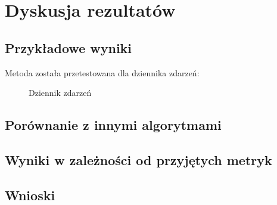 \chapter{Dyskusja rezultatów}

\section{Przykładowe wyniki}
Metoda została przetestowana dla dziennika zdarzeń:
\begin{figure}[!ht]
	\caption{\label{fig:flow_chart}Dziennik zdarzeń}
\end{figure}


\section{Porównanie z innymi algorytmami}

\section{Wyniki w zależności od przyjętych metryk}

\section{Wnioski}
